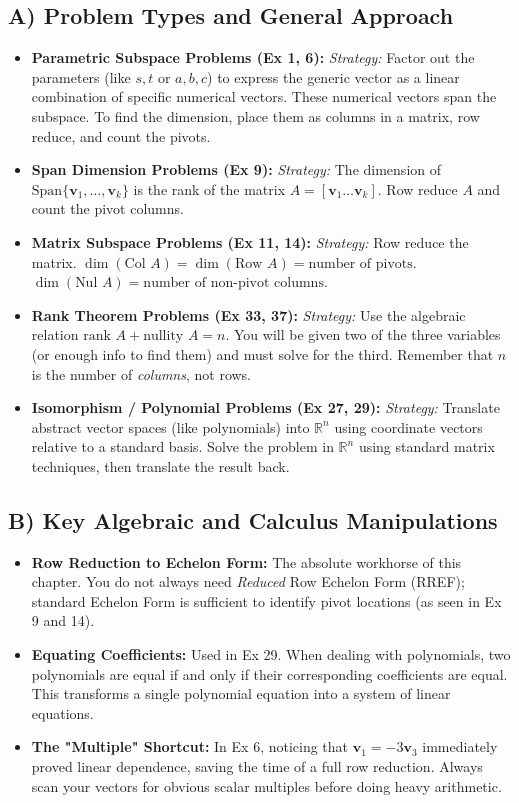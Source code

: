 \documentclass[12pt]{article}
\begin{document}
\subsection{A) Problem Types and General Approach}
\begin{itemize}
    \item \textbf{Parametric Subspace Problems (Ex 1, 6):} 
    \textit{Strategy:} Factor out the parameters (like $s, t$ or $a, b, c$) to express the generic vector as a linear combination of specific numerical vectors. These numerical vectors span the subspace. To find the dimension, place them as columns in a matrix, row reduce, and count the pivots.
    \item \textbf{Span Dimension Problems (Ex 9):} 
    \textit{Strategy:} The dimension of $\text{Span}\{\mathbf{v}_1, \dots, \mathbf{v}_k\}$ is the rank of the matrix $A = [\mathbf{v}_1 \dots \mathbf{v}_k]$. Row reduce $A$ and count the pivot columns.
    \item \textbf{Matrix Subspace Problems (Ex 11, 14):} 
    \textit{Strategy:} Row reduce the matrix. $\dim(\text{Col } A) = \dim(\text{Row } A) = \text{number of pivots}$. $\dim(\text{Nul } A) = \text{number of non-pivot columns}$.
    \item \textbf{Rank Theorem Problems (Ex 33, 37):} 
    \textit{Strategy:} Use the algebraic relation $\text{rank } A + \text{nullity } A = n$. You will be given two of the three variables (or enough info to find them) and must solve for the third. Remember that $n$ is the number of \textit{columns}, not rows.
    \item \textbf{Isomorphism / Polynomial Problems (Ex 27, 29):} 
    \textit{Strategy:} Translate abstract vector spaces (like polynomials) into $\mathbb{R}^n$ using coordinate vectors relative to a standard basis. Solve the problem in $\mathbb{R}^n$ using standard matrix techniques, then translate the result back.
\end{itemize}

\subsection{B) Key Algebraic and Calculus Manipulations}
\begin{itemize}
    \item \textbf{Row Reduction to Echelon Form:} The absolute workhorse of this chapter. You do not always need \textit{Reduced} Row Echelon Form (RREF); standard Echelon Form is sufficient to identify pivot locations (as seen in Ex 9 and 14).
    \item \textbf{Equating Coefficients:} Used in Ex 29. When dealing with polynomials, two polynomials are equal if and only if their corresponding coefficients are equal. This transforms a single polynomial equation into a system of linear equations.
    \item \textbf{The "Multiple" Shortcut:} In Ex 6, noticing that $\mathbf{v}_1 = -3\mathbf{v}_3$ immediately proved linear dependence, saving the time of a full row reduction. Always scan your vectors for obvious scalar multiples before doing heavy arithmetic.
\end{itemize}
\end{document}
